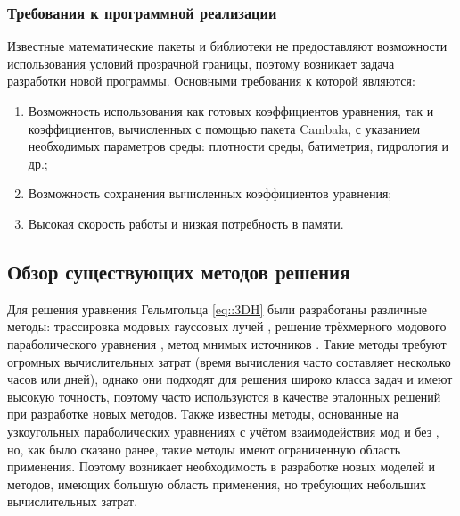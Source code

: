 \documentclass{fefu}
\begin{document}
            \subsubsection{Требования к программной реализации}
                \par Известные математические пакеты и библиотеки не предоставляют возможности использования условий прозрачной границы, поэтому возникает задача разработки новой программы. Основными требования к которой являются:
                \begin{enumerate}
                    \item Возможность использования как готовых коэффициентов уравнения, так и коэффициентов, вычисленных с помощью пакета Cambala, с указанием необходимых параметров среды: плотности среды, батиметрия, гидрология и др.;
                    \item Возможность сохранения вычисленных коэффициентов уравнения;
                    \item Высокая скорость работы и низкая потребность в памяти.
                \end{enumerate}
        \subsection{Обзор существующих методов решения}
            \par Для решения уравнения Гельмгольца \eqref{eq::3DH} были разработаны различные методы: трассировка модовых гауссовых лучей \cite{trofimov16}, решение трёхмерного модового параболического уравнения \cite{isakson14,lin12,shtrum16}, метод мнимых источников \cite{deane93, tang18}. Такие методы требуют огромных вычислительных затрат (время вычисления часто составляет несколько часов или дней), однако они подходят для решения широко класса задач и имеют высокую точность, поэтому часто используются в качестве эталонных решений при разработке новых методов. Также известны методы, основанные на узкоугольных параболических уравнениях с учётом взаимодействия мод \cite{trofimov15} и без \cite{petrov16}, но, как было сказано ранее, такие методы имеют ограниченную область применения. Поэтому возникает необходимость в разработке новых моделей и методов, имеющих большую область применения, но требующих небольших вычислительных затрат.
\end{document}
